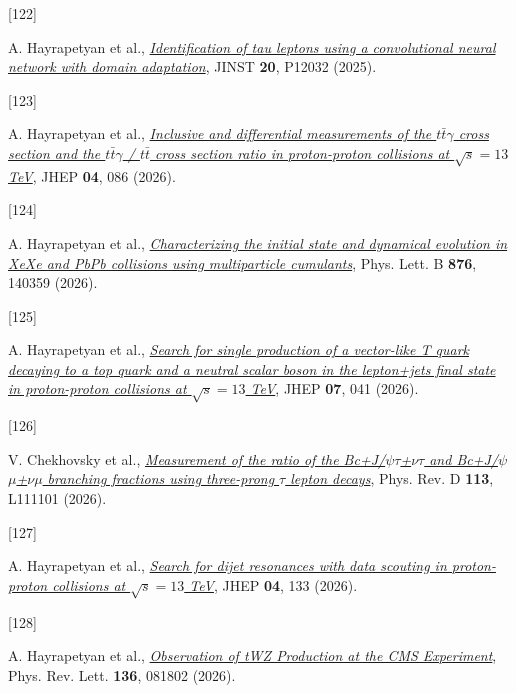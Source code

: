 \documentclass[
]{article}
\newlength{\cslhangindent}
\newlength{\csllabelwidth}
\newenvironment{CSLReferences}[2] %
 {\begin{list}{}{%
  \setlength{\itemindent}{0pt}
  \setlength{\leftmargin}{0pt}
  \setlength{\parsep}{0pt}
  \ifodd #1
   \setlength{\leftmargin}{\cslhangindent}
   \setlength{\itemindent}{-1\cslhangindent}
  \fi
  \setlength{\itemsep}{#2\baselineskip}}}
 {\end{list}}
\newcommand{\CSLLeftMargin}[1]{\parbox[t]{\csllabelwidth}{\strut#1\strut}}
\newcommand{\CSLRightInline}[1]{\parbox[t]{\linewidth - \csllabelwidth}{\strut#1\strut}}
\begin{document}
\begin{CSLReferences}{0}{0}
\CSLLeftMargin{{[}122{]} }%
\CSLRightInline{A. Hayrapetyan et al.,
\emph{\href{https://doi.org/10.1088/1748-0221/20/12/P12032}{{Identification
of tau leptons using a convolutional neural network with domain
adaptation}}}, JINST \textbf{20}, P12032 (2025).}

\CSLLeftMargin{{[}123{]} }%
\CSLRightInline{A. Hayrapetyan et al.,
\emph{\href{https://doi.org/10.1007/JHEP04(2026)086}{{Inclusive and
differential measurements of the \(t\bar{t}\gamma\) cross section and
the \(t\bar{t}\gamma\) / \(t\bar{t}\) cross section ratio in
proton-proton collisions at \(\sqrt{s} = 13\) TeV}}}, JHEP \textbf{04},
086 (2026).}

\CSLLeftMargin{{[}124{]} }%
\CSLRightInline{A. Hayrapetyan et al.,
\emph{\href{https://doi.org/10.1016/j.physletb.2026.140359}{{Characterizing
the initial state and dynamical evolution in XeXe and PbPb collisions
using multiparticle cumulants}}}, Phys. Lett. B \textbf{876}, 140359
(2026).}

\CSLLeftMargin{{[}125{]} }%
\CSLRightInline{A. Hayrapetyan et al.,
\emph{\href{https://doi.org/10.1007/JHEP07(2026)041}{{Search for single
production of a vector-like T quark decaying to a top quark and a
neutral scalar boson in the lepton+jets final state in proton-proton
collisions at \(\sqrt{s}=13\) TeV}}}, JHEP \textbf{07}, 041 (2026).}

\CSLLeftMargin{{[}126{]} }%
\CSLRightInline{V. Chekhovsky et al.,
\emph{\href{https://doi.org/10.1103/mw5c-5rw3}{{Measurement of the ratio
of the Bc+{\textrightarrow}J/{\(\psi\)}{\(\tau\)}+{\(\nu\)}{\(\tau\)}
and Bc+{\textrightarrow}J/{\(\psi\)}{\(\mu\)}+{\(\nu\)}{\(\mu\)}
branching fractions using three-prong {\(\tau\)} lepton decays}}}, Phys.
Rev. D \textbf{113}, L111101 (2026).}

\CSLLeftMargin{{[}127{]} }%
\CSLRightInline{A. Hayrapetyan et al.,
\emph{\href{https://doi.org/10.1007/JHEP04(2026)133}{{Search for dijet
resonances with data scouting in proton-proton collisions at
\(\sqrt{s}=13\) TeV}}}, JHEP \textbf{04}, 133 (2026).}

\CSLLeftMargin{{[}128{]} }%
\CSLRightInline{A. Hayrapetyan et al.,
\emph{\href{https://doi.org/10.1103/rk6w-1pcl}{{Observation of tWZ
Production at the CMS Experiment}}}, Phys. Rev. Lett. \textbf{136},
081802 (2026).}


\end{CSLReferences}
\end{document}

